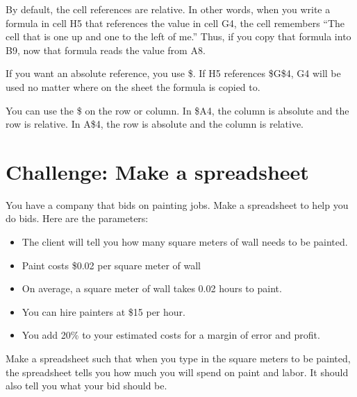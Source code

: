 By default, the cell references are relative. In other words, when you write
a formula in cell H5 that references the value in cell G4, the cell
remembers ``The cell that is one up and one to the left of me.''
Thus, if you copy that formula into B9, now that formula reads the
value from A8.

If you want an absolute reference, you use \$. If H5 references
\$G\$4, G4 will be used no matter where on the sheet the formula is
copied to.

You can use the \$ on the row or column. In \$A4, the column is
absolute and the row is relative.  In A\$4, the row is absolute and
the column is relative.

\section{Challenge: Make a spreadsheet}

You have a company that bids on painting jobs. Make a
spreadsheet to help you do bids. Here are the parameters:
\begin{itemize}
\item The client will tell you how many square meters of wall needs to be painted.
\item Paint costs \$0.02 per square meter of wall
\item On average, a square meter of wall takes 0.02 hours to paint.
\item You can hire painters at \$15 per hour.
\item You add 20\% to your estimated costs for a margin of error and profit.
\end{itemize}

Make a spreadsheet such that when you type in the square meters to be
painted, the spreadsheet tells you how much you will spend on paint
and labor.  It should also tell you what your bid should be.

